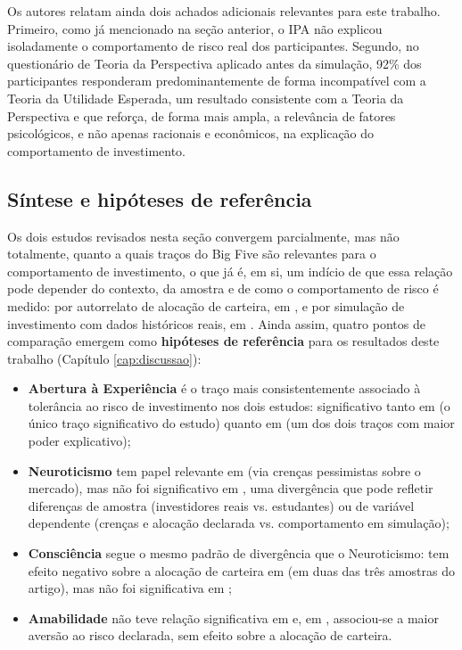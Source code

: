 Os autores relatam ainda dois achados adicionais relevantes para este
trabalho. Primeiro, como já mencionado na seção anterior, o IPA não
explicou isoladamente o comportamento de risco real dos participantes.
Segundo, no questionário de Teoria da Perspectiva aplicado antes da
simulação, 92\% dos participantes responderam predominantemente de forma
incompatível com a Teoria da Utilidade Esperada, um resultado consistente
com a Teoria da Perspectiva e que reforça, de forma mais ampla, a relevância de fatores
psicológicos, e não apenas racionais e econômicos, na explicação do
comportamento de investimento.

\subsection{Síntese e hipóteses de referência}
\label{sec:hipoteses-referencia}

Os dois estudos revisados nesta seção convergem parcialmente, mas não
totalmente, quanto a quais traços do Big Five são relevantes para o
comportamento de investimento, o que já é, em si, um indício de que essa
relação pode depender do contexto, da amostra e de como o comportamento de
risco é medido: por autorrelato de alocação de carteira, em
, e por simulação de investimento com dados
históricos reais, em . Ainda assim,
quatro pontos de comparação emergem como \textbf{hipóteses de
referência} para os resultados deste trabalho (Capítulo
\ref{cap:discussao}):

\begin{itemize}
    \item \textbf{Abertura à Experiência} é o traço mais consistentemente
    associado à tolerância ao risco de investimento nos dois estudos:
    significativo tanto em  (o único traço
    significativo do estudo) quanto em  (um
    dos dois traços com maior poder explicativo);
    \item \textbf{Neuroticismo} tem papel relevante em
     (via crenças pessimistas sobre o
    mercado), mas não foi significativo em , uma
    divergência que pode refletir diferenças de amostra (investidores
    reais vs. estudantes) ou de variável dependente (crenças e alocação
    declarada vs. comportamento em simulação);
    \item \textbf{Consciência} segue o mesmo padrão de divergência que o
    Neuroticismo: tem efeito negativo sobre a alocação de carteira em
     (em duas das três amostras do artigo),
    mas não foi significativa em ;
    \item \textbf{Amabilidade} não teve relação significativa em
     e, em ,
    associou-se a maior aversão ao risco declarada, sem efeito sobre a
    alocação de carteira.
\end{itemize}

